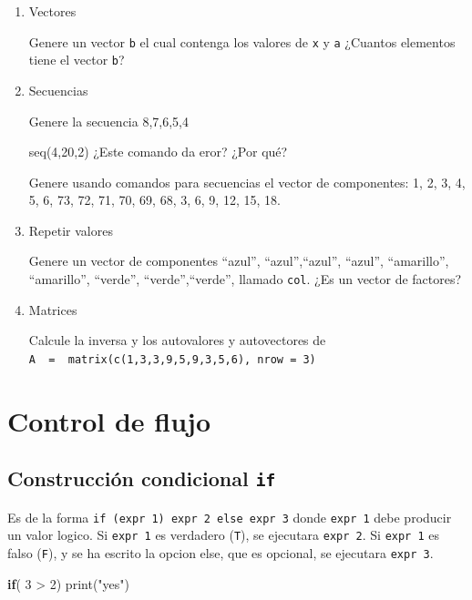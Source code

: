 \documentclass[
]{book}
\newenvironment{Shaded}{\begin{snugshade}}{\end{snugshade}}
\newcommand{\ControlFlowTok}[1]{\textcolor[rgb]{0.13,0.29,0.53}{\textbf{#1}}}
\newcommand{\DecValTok}[1]{\textcolor[rgb]{0.00,0.00,0.81}{#1}}
\newcommand{\FunctionTok}[1]{\textcolor[rgb]{0.00,0.00,0.00}{#1}}
\newcommand{\NormalTok}[1]{#1}
\newcommand{\SpecialCharTok}[1]{\textcolor[rgb]{0.00,0.00,0.00}{#1}}
\newcommand{\StringTok}[1]{\textcolor[rgb]{0.31,0.60,0.02}{#1}}
\begin{document}
\begin{enumerate}
\def\labelenumi{\arabic{enumi}.}
\item
  Vectores

  Genere un vector \texttt{b} el cual contenga los valores de \texttt{x} y \texttt{a} ¿Cuantos elementos tiene el vector \texttt{b}?
\item
  Secuencias

  Genere la secuencia 8,7,6,5,4

  seq(4,20,2) ¿Este comando da eror? ¿Por qué?

  Genere usando comandos para secuencias el vector de componentes: 1, 2, 3, 4, 5, 6, 73, 72, 71, 70, 69, 68, 3, 6, 9, 12, 15, 18.
\item
  Repetir valores

  Genere un vector de componentes ``azul'', ``azul'',``azul'', ``azul'', ``amarillo'', ``amarillo'', ``verde'', ``verde'',``verde'', llamado \texttt{col}. ¿Es un vector de factores?
\item
  Matrices

  Calcule la inversa y los autovalores y autovectores de \texttt{A\ \ =\ \ matrix(c(1,3,3,9,5,9,3,5,6),\ nrow\ =\ 3)}
\end{enumerate}

\hypertarget{control-de-flujo}{%
\chapter{Control de flujo}\label{control-de-flujo}}

\hypertarget{construcciuxf3n-condicional-if}{%
\section{\texorpdfstring{Construcción condicional \texttt{if}}{Construcción condicional if}}\label{construcciuxf3n-condicional-if}}

Es de la forma \texttt{if\ (expr\ 1)\ expr\ 2\ else\ expr\ 3} donde \texttt{expr\ 1} debe producir un valor logico. Si \texttt{expr\ 1} es verdadero (\texttt{T}), se ejecutara \texttt{expr\ 2}. Si \texttt{expr\ 1} es falso (\texttt{F}), y se ha escrito la opcion else, que es opcional, se ejecutara \texttt{expr\ 3}.

\begin{Shaded}
\begin{Highlighting}[]
\ControlFlowTok{if}\NormalTok{( }\DecValTok{3} \SpecialCharTok{\textgreater{}} \DecValTok{2}\NormalTok{) }\FunctionTok{print}\NormalTok{(}\StringTok{"yes"}\NormalTok{)}
\end{Highlighting}
\end{Shaded}
\end{document}
